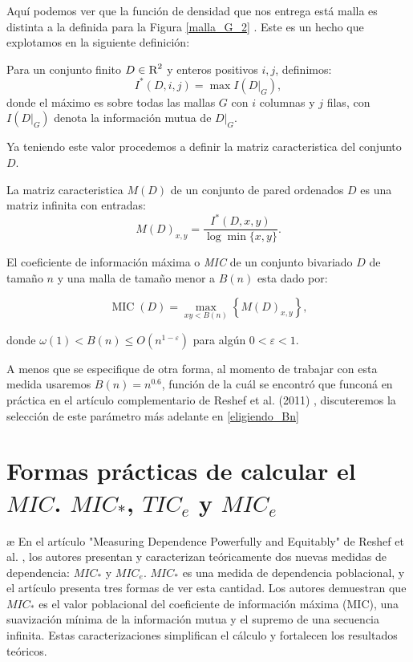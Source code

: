 	Aqu\'i podemos ver que la funci\'on de densidad que nos entrega est\'a malla es distinta a la definida para la Figura \ref{malla_G_2} . Este es un hecho que explotamos en la siguiente definici\'on: 

	\begin{defn}
		Para un conjunto finito $D\in\textsc{R}^2$ y enteros positivos $i,j$, definimos:
		$$
		I^*(D,i,j)=\max I(D|_G),
		$$
		donde el m\'aximo es sobre todas las mallas $G$ con $i$ columnas y $j$ filas, con $I(D|_G)$ denota la informaci\'on mutua de $D|_G$.
	\end{defn}

	Ya teniendo este valor procedemos a definir la matriz caracteristica del conjunto $D$.

	\begin{defn}
		La matriz caracteristica $M(D)$ de un conjunto de pared ordenados $D$ es una matriz infinita con entradas:
		$$
		M(D)_{x, y}=\frac{I^{*}(D, x, y)}{\log \min \{x, y\}}.
		$$
	\end{defn}
	\begin{defn}
		El coeficiente de informaci\'on m\'axima o \textit{MIC} de un conjunto bivariado $D$ de tama\~no $n$ y una malla de tama\~no menor a $B(n)$ esta dado por:

		$$
		\operatorname{MIC}(D)=\max _{x y<B(n)}\left\{M(D)_{x, y}\right\},
		$$

		donde $\omega(1)<B(n) \leq O\left(n^{1-\varepsilon}\right)$ para alg\'un $0<\varepsilon<1$.
	\end{defn}
	\begin{rem}
		A menos que se especifique de otra forma, al momento de trabajar con esta medida usaremos $B(n)=n^{0.6}$, funci\'on de la cu\'al se encontr\'o que funcon\'a en pr\'actica en el art\'iculo complementario de Reshef et al. (2011) \cite[]{Reshef2011}, discuteremos la selecci\'on de este par\'ametro m\'as adelante en \ref{eligiendo_Bn}
	\end{rem}


	\section[Formas practicas de calcular el MIC. MIC*, TICe y MICe]{Formas pr\'acticas de calcular el $MIC$. $MIC_*$, $TIC_e$ y $MIC_e$}
æ
	En el art\'iculo "Measuring Dependence Powerfully and Equitably" de Reshef et al. \cite{Reshef2016}, los autores presentan y caracterizan te\'oricamente dos nuevas medidas de dependencia: $MIC_*$ y $MIC_e$. $MIC_*$ es una medida de dependencia poblacional, y el art\' iculo presenta tres formas de ver esta cantidad. Los autores demuestran que $MIC_*$ es el valor poblacional del coeficiente de informaci\'on m\'axima (MIC), una suavizaci\'on m\'inima de la informaci\'on mutua y el supremo de una secuencia infinita. Estas caracterizaciones simplifican el c\'alculo y fortalecen los resultados te\'oricos.

